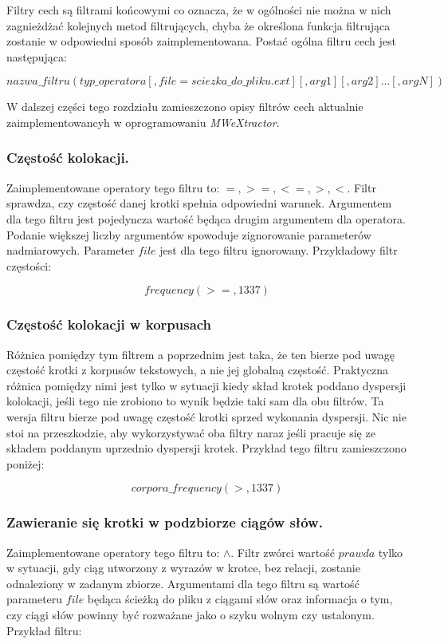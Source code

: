 \documentclass[11pt,a4paper]{llncs}
\begin{document}
Filtry cech są filtrami końcowymi co oznacza, że w ogólności nie można w nich zagnieżdżać kolejnych metod filtrujących, chyba że określona funkcja filtrująca zostanie w odpowiedni sposób zaimplementowana.
Postać ogólna filtru cech jest następująca:

$$ nazwa\_filtru(typ\_operatora[,file=sciezka\_do\_pliku.ext][,arg1][,arg2]...[,argN]) $$

W dalszej części tego rozdziału zamieszczono opisy filtrów cech aktualnie zaimplementowancyh w oprogramowaniu \emph{MWeXtractor}.

\subsubsection{Częstość kolokacji.}
Zaimplementowane operatory tego filtru to: $ =, >=, <=, >, < $.
Filtr sprawdza, czy częstość danej krotki spełnia odpowiedni warunek.
Argumentem dla tego filtru jest pojedyncza wartość będąca drugim argumentem dla operatora.
Podanie większej liczby argumentów spowoduje zignorowanie parameterów nadmiarowych.
Parameter $ file $ jest dla tego filtru ignorowany.
Przykładowy filtr częstości:

$$ frequency(>=,1337) $$

\subsubsection{Częstość kolokacji w korpusach}
Różnica pomiędzy tym filtrem a poprzednim jest taka, że ten bierze pod uwagę częstość krotki z korpusów tekstowych, a nie jej globalną częstość.
Praktyczna różnica pomiędzy nimi jest tylko w sytuacji kiedy skład krotek poddano dyspersji kolokacji, jeśli tego nie zrobiono to wynik będzie taki sam dla obu filtrów.
Ta wersja filtru bierze pod uwagę częstość krotki sprzed wykonania dyspersji.
Nic nie stoi na przeszkodzie, aby wykorzystywać oba filtry naraz jeśli pracuje się ze składem poddanym uprzednio dyspersji krotek.
Przykład tego filtru zamieszczono poniżej:

$$ corpora\_frequency(>,1337) $$

\subsubsection{Zawieranie się krotki w podzbiorze ciągów słów.}
Zaimplementowane operatory tego filtru to: $ \wedge $.
Filtr zwórci wartość $ prawda $ tylko w sytuacji, gdy ciąg utworzony z wyrazów w krotce, bez relacji, zostanie odnaleziony w zadanym zbiorze.
Argumentami dla tego filtru są wartość parameteru $ file $ będąca ścieżką do pliku z ciągami słów oraz informacja o tym, czy ciągi słów powinny być rozważane jako o szyku wolnym czy ustalonym.
Przykład filtru:
\end{document}
